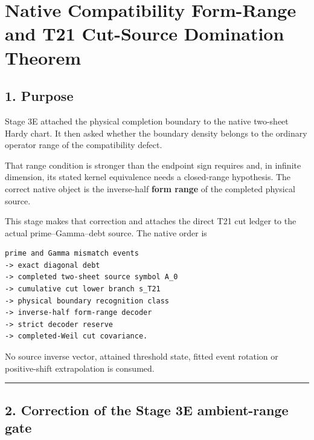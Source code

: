 \hypertarget{native-compatibility-form-range-and-t21-cut-source-domination-theorem}{%
\chapter{Native Compatibility Form-Range and T21 Cut-Source Domination Theorem}\label{native-compatibility-form-range-and-t21-cut-source-domination-theorem}}

\hypertarget{purpose}{%
\section{1. Purpose}\label{purpose}}

Stage 3E attached the physical completion boundary to the native two-sheet
Hardy chart. It then asked whether the boundary density belongs to the
ordinary operator range of the compatibility defect.

That range condition is stronger than the endpoint sign requires and, in
infinite dimension, its stated kernel equivalence needs a closed-range
hypothesis. The correct native object is the inverse-half \textbf{form range} of the
completed physical source.

This stage makes that correction and attaches the direct T21 cut ledger to the
actual prime--Gamma--debt source. The native order is

\begin{verbatim}
prime and Gamma mismatch events
-> exact diagonal debt
-> completed two-sheet source symbol A_0
-> cumulative cut lower branch s_T21
-> physical boundary recognition class
-> inverse-half form-range decoder
-> strict decoder reserve
-> completed-Weil cut covariance.
\end{verbatim}

No source inverse vector, attained threshold state, fitted event rotation or
positive-shift extrapolation is consumed.

\begin{center}\rule{0.5\linewidth}{0.5pt}\end{center}

\hypertarget{correction-of-the-stage-3e-ambient-range-gate}{%
\section{2. Correction of the Stage 3E ambient-range gate}\label{correction-of-the-stage-3e-ambient-range-gate}}

